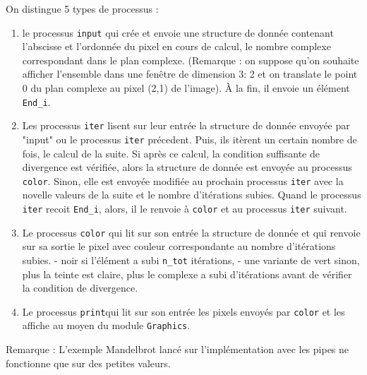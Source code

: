 \documentclass[11pt,a4paper]{article}
\renewcommand{\tt}[1]{\texttt{#1}}
\begin{document}
On distingue 5 types de processus :
\begin{enumerate}

\item le processus \tt{input} qui crée et envoie une structure de donnée
   contenant l'abscisse et l'ordonnée du pixel en cours de calcul, le
   nombre complexe correspondant dans le plan complexe. (Remarque : on
   suppose qu'on souhaite afficher l'ensemble dans une fenêtre de
   dimension 3: 2 et on translate le point 0 du plan complexe au pixel  
   (2,1) de l'image).
   À la fin, il envoie un élément \tt{End\_i}.

\item Les processus \tt{iter} lisent sur leur entrée la structure de donnée
   envoyée par "input" ou le processus \tt{iter} précedent. Puis, ils
   itèrent un certain nombre de fois, le calcul de la suite. Si après ce
   calcul, la condition suffisante de divergence est vérifiée, alors la
   structure de donnée  est
   envoyée au processus \tt{color}. Sinon, elle est envoyée modifiée  au 
   prochain processus \tt{iter} avec la novelle valeurs de la suite et le
   nombre d'itérations \og subies\fg .
   Quand le processus \tt{iter} recoit \tt{End\_i}, alors, il le renvoie
   à \tt{color} et au processus \tt{iter} suivant. 

\item Le processus \tt{color} qui lit sur son entrée la structure de donnée et
   qui renvoie sur sa sortie le pixel avec couleur correspondante au
   nombre d'itérations subies.
   - noir si l'élément a subi \tt{n\_tot} itérations,
   - une variante de vert sinon, plus la teinte est claire, plus le
	 complexe a subi d'itérations avant de vérifier la condition de
	 divergence.


\item Le processus \tt{print}qui lit sur son entrée les pixels envoyés par
	\tt{color} et les affiche au moyen du module \tt{Graphics}.
	

\end{enumerate}

Remarque : 
	L'exemple Mandelbrot lancé sur l'implémentation avec les pipes ne
	fonctionne que sur des petites valeurs. 
\end{document}
